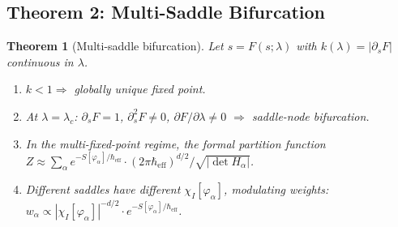 \documentclass[12pt,a4paper]{article}
\newtheorem{theorem}{Theorem}[section]
\theoremstyle{definition}
\newcommand{\chiI}{\chi_I}
\newcommand{\Heff}{\hbar_{\mathrm{eff}}}
\begin{document}
\subsection{Theorem 2: Multi-Saddle Bifurcation}

\begin{theorem}[Multi-saddle bifurcation]
\label{thm:t2}
Let $s = F(s; \lambda)$ with $k(\lambda) = |\partial_s F|$ continuous in $\lambda$.
\begin{enumerate}[label=(T2-\alph*)]
\item $k < 1 \Rightarrow$ globally unique fixed point.
\item At $\lambda = \lambda_c$: $\partial_s F = 1$, $\partial_s^2 F \neq 0$, $\partial F/\partial\lambda \neq 0$ $\Rightarrow$ saddle-node bifurcation.
\item In the multi-fixed-point regime, the formal partition function $Z \approx \sum_\alpha e^{-S[\varphi_\alpha]/\Heff} \cdot (2\pi\Heff)^{d/2}/\sqrt{|\det H_\alpha|}$.
\item Different saddles have different $\chiI[\varphi_\alpha]$, modulating weights: $w_\alpha \propto |\chiI[\varphi_\alpha]|^{-d/2} \cdot e^{-S[\varphi_\alpha]/\Heff}$.
\end{enumerate}
\end{theorem}
\end{document}
